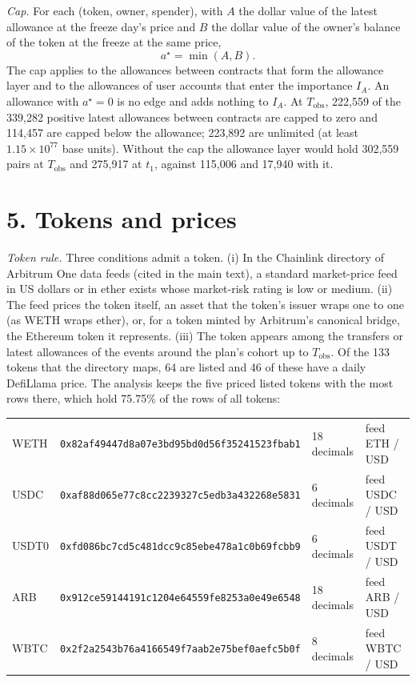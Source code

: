 \documentclass[10pt,letterpaper]{article}
\newcommand{\hash}[1]{\texttt{\small #1}}
\begin{document}
\textit{Cap.} For each (token, owner, spender), with $A$ the dollar value of the latest allowance at the freeze day's price and $B$ the dollar value of the owner's balance of the token at the freeze at the same price,
\[
a^{\star}=\min(A,B).
\]
The cap applies to the allowances between contracts that form the allowance layer and to the allowances of user accounts that enter the importance $I_A$. An allowance with $a^{\star}=0$ is no edge and adds nothing to $I_A$. At $T_{\mathrm{obs}}$, 222,559 of the 339,282 positive latest allowances between contracts are capped to zero and 114,457 are capped below the allowance; 223,892 are unlimited (at least $1.15\times10^{77}$ base units). Without the cap the allowance layer would hold 302,559 pairs at $T_{\mathrm{obs}}$ and 275,917 at $t_1$, against 115,006 and 17,940 with it.

\section*{5. Tokens and prices}
\textit{Token rule.} Three conditions admit a token. (i) In the Chainlink directory of Arbitrum One data feeds (cited in the main text), a standard market-price feed in US dollars or in ether exists whose market-risk rating is low or medium. (ii) The feed prices the token itself, an asset that the token's issuer wraps one to one (as WETH wraps ether), or, for a token minted by Arbitrum's canonical bridge, the Ethereum token it represents. (iii) The token appears among the transfers or latest allowances of the events around the plan's cohort up to $T_{\mathrm{obs}}$. Of the 133 tokens that the directory maps, 64 are listed and 46 of these have a daily DefiLlama price. The analysis keeps the five priced listed tokens with the most rows there, which hold 75.75\% of the rows of all tokens:

{\small\begin{tabular}{llll}
WETH & \hash{0x82af49447d8a07e3bd95bd0d56f35241523fbab1} & 18 decimals & feed ETH / USD \\
USDC & \hash{0xaf88d065e77c8cc2239327c5edb3a432268e5831} & 6 decimals & feed USDC / USD \\
USDT0 & \hash{0xfd086bc7cd5c481dcc9c85ebe478a1c0b69fcbb9} & 6 decimals & feed USDT / USD \\
ARB & \hash{0x912ce59144191c1204e64559fe8253a0e49e6548} & 18 decimals & feed ARB / USD \\
WBTC & \hash{0x2f2a2543b76a4166549f7aab2e75bef0aefc5b0f} & 8 decimals & feed WBTC / USD \\
\end{tabular}}
\end{document}
